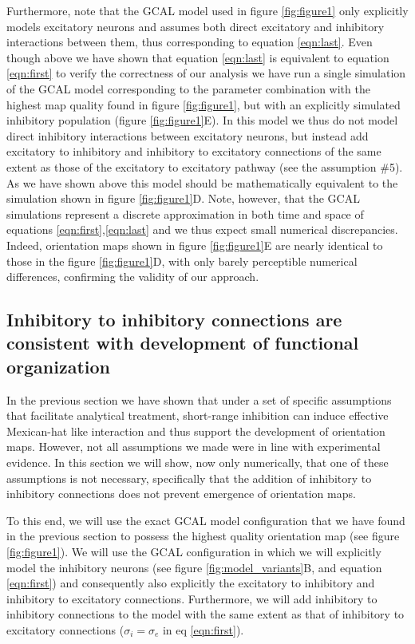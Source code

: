 \documentclass[utf8]{frontiersSCNS}
\begin{document}
Furthermore, note that the GCAL model used in figure \ref{fig:figure1} only explicitly models excitatory neurons and assumes both direct excitatory and inhibitory
interactions between them, thus corresponding to equation \ref{eqn:last}. Even though above we have shown that equation \ref{eqn:last} is equivalent to equation \ref{eqn:first} to verify 
the correctness of our analysis we have run a single simulation of the GCAL model corresponding to the parameter combination with the highest map 
quality found in figure \ref{fig:figure1}, but with an explicitly simulated inhibitory population (figure \ref{fig:figure1}E). In this model we thus do not model direct inhibitory 
interactions between excitatory neurons, but instead add excitatory to inhibitory and inhibitory to excitatory connections of the same extent as those of the excitatory to excitatory pathway (see the assumption \#5). 
As we have shown above this model should be mathematically equivalent to the simulation shown in figure \ref{fig:figure1}D. Note, however, that the GCAL simulations represent a discrete approximation 
in both time and space of equations \ref{eqn:first},\ref{eqn:last} and we thus expect small numerical discrepancies. Indeed, orientation maps shown in figure \ref{fig:figure1}E  are nearly identical to those 
in the figure \ref{fig:figure1}D, with only barely perceptible numerical differences, confirming the validity of our approach.


\subsection{Inhibitory to inhibitory connections are consistent with development of functional organization} \label{sec:SM2}

In the previous section we have shown that under a set of specific assumptions that facilitate analytical treatment, short-range inhibition can induce 
effective Mexican-hat like interaction and thus support the development of orientation maps. However, not all assumptions we 
made were in line with experimental evidence. In this section we will show, now only numerically, that one of these assumptions is not necessary, 
specifically that the addition of inhibitory to inhibitory connections does not prevent emergence of orientation maps. 

To this end, we will use the exact GCAL model configuration that we have found in the previous section to possess the highest
quality orientation map (see figure \ref{fig:figure1}). We will use the GCAL configuration in which we will explicitly model the inhibitory neurons
(see figure \ref{fig:model_variants}B, and equation \ref{eqn:first}) and consequently also explicitly the excitatory to inhibitory and inhibitory to excitatory connections.
Furthermore, we will add inhibitory to inhibitory connections to the model with the same extent as that of inhibitory to excitatory
connections ($\sigma_{i} = \sigma_{e}$ in eq \ref{eqn:first}). 
\end{document}
